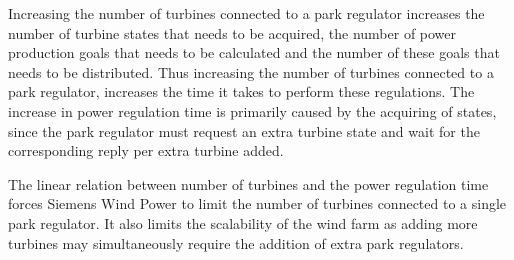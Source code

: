 Increasing the number of turbines connected to a park regulator increases the number of turbine states that needs to be acquired, the number of power production goals that needs to be calculated and the number of these goals that needs to be distributed. Thus increasing the number of turbines connected to a park regulator, increases the time it takes to perform these regulations. The increase in power regulation time is primarily caused by the acquiring of states, since the park regulator must request an extra turbine state and wait for the corresponding reply per extra turbine added.

The linear relation between number of turbines and the power regulation time forces Siemens Wind Power to limit the number of turbines connected to a single park regulator. It also limits the scalability of the wind farm as adding more turbines may simultaneously require the addition of extra park regulators.



